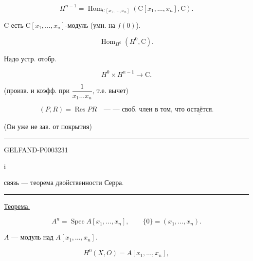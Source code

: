 \begin{equation*}H^{n-1}=\operatorname{Hom}_{\mathrm C[x_1,\ldots,x_n]}(\mathrm C[x_1,\ldots,x_n],\mathrm C).\end{equation*}

$\mathrm C$ есть $\mathrm C[x_1,\ldots,x_n]$-модуль (умн. на $f(0)$).

\begin{equation*}\operatorname{Hom}_{H^0}(H^0,\mathrm C).\end{equation*}

Надо устр. отобр.

\begin{equation*}H^0\times H^{n-1}\longrightarrow\mathrm C.\end{equation*}

(произв. и коэфф. при $\dfrac1{x_1\ldots x_n}$, т.е. вычет)

\begin{equation*}(P,R)=\operatorname{Res}PR\quad\text{--- --- своб. член в том, что }\underline{\underline{\text{остаётся}}}.\end{equation*}

(Он уже не зав. от покрытия)

\begin{center}\rule{.95\linewidth}{.3pt}\end{center}

\begin{GelfandAdjacentEvidence}{GELFAND-P000323}{1}
\begin{center}$\mathrm i$\end{center}

\end{GelfandAdjacentEvidence}


связь --- теорема двойственности Серра.

\begin{center}\rule{.95\linewidth}{.3pt}\end{center}

\uline{Теорема.}

\begin{equation*}A^n=\operatorname{Spec} A[x_1,\ldots,x_n],\qquad\{0\}=(x_1,\ldots,x_n).\end{equation*}

$A$ --- модуль над $A[x_1,\ldots,x_n]$.

\begin{equation*}H^0(X,O)=A[x_1,\ldots,x_n],\end{equation*}

